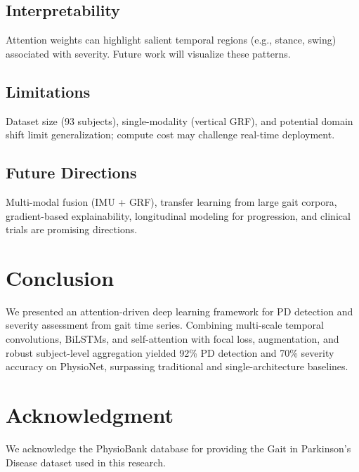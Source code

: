 \documentclass[conference]{IEEEtran}
\begin{document}
\subsection{Interpretability}
Attention weights can highlight salient temporal regions (e.g., stance, swing) associated with severity. Future work will visualize these patterns.

\subsection{Limitations}
Dataset size (93 subjects), single-modality (vertical GRF), and potential domain shift limit generalization; compute cost may challenge real-time deployment.

\subsection{Future Directions}
Multi-modal fusion (IMU + GRF), transfer learning from large gait corpora, gradient-based explainability, longitudinal modeling for progression, and clinical trials are promising directions.

\section{Conclusion}
We presented an attention-driven deep learning framework for PD detection and severity assessment from gait time series. Combining multi-scale temporal convolutions, BiLSTMs, and self-attention with focal loss, augmentation, and robust subject-level aggregation yielded 92\% PD detection and 70\% severity accuracy on PhysioNet, surpassing traditional and single-architecture baselines.

\section*{Acknowledgment}
We acknowledge the PhysioBank database for providing the Gait in Parkinson's Disease dataset used in this research.
\end{document}
